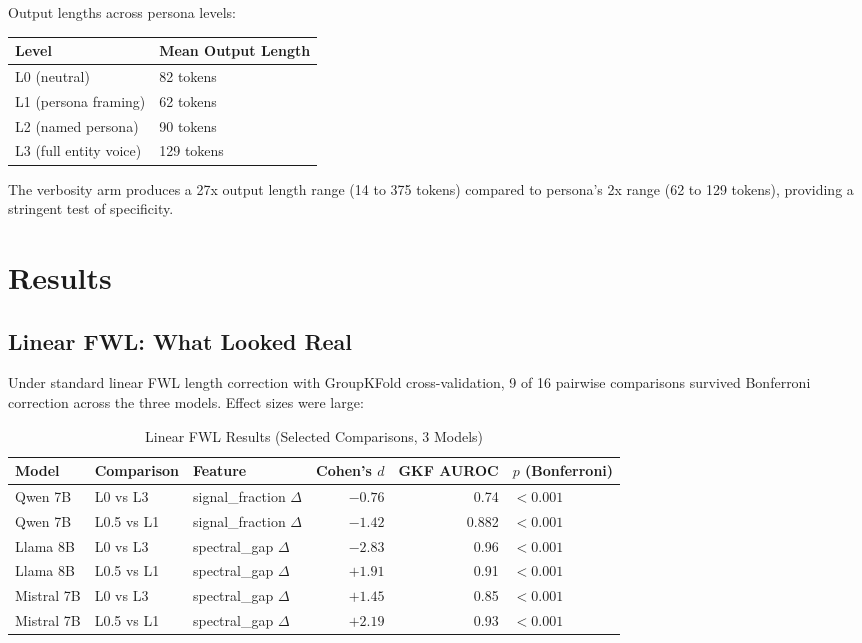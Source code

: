 \documentclass[11pt]{article}
\begin{document}
Output lengths across persona levels:

\begin{table}[H]
\centering
\begin{tabular}{ll}
\toprule
Level & Mean Output Length \\
\midrule
L0 (neutral) & 82 tokens \\
L1 (persona framing) & 62 tokens \\
L2 (named persona) & 90 tokens \\
L3 (full entity voice) & 129 tokens \\
\bottomrule
\end{tabular}
\end{table}

The verbosity arm produces a 27x output length range (14 to 375 tokens) compared to persona's 2x range (62 to 129 tokens), providing a stringent test of specificity.

\section{Results}
\label{sec:results}

\subsection{Linear FWL: What Looked Real}
\label{sec:linear-fwl}

Under standard linear FWL length correction with GroupKFold cross-validation, 9 of 16 pairwise comparisons survived Bonferroni correction across the three models. Effect sizes were large:

\begin{table}[H]
\centering
\caption{Linear FWL Results (Selected Comparisons, 3 Models)}
\label{tab:linear-fwl}
\begin{tabular}{lllrrl}
\toprule
Model & Comparison & Feature & Cohen's $d$ & GKF AUROC & $p$ (Bonferroni) \\
\midrule
Qwen 7B & L0 vs L3 & signal\_fraction $\Delta$ & $-0.76$ & 0.74 & $< 0.001$ \\
Qwen 7B & L0.5 vs L1 & signal\_fraction $\Delta$ & $-1.42$ & 0.882 & $< 0.001$ \\
Llama 8B & L0 vs L3 & spectral\_gap $\Delta$ & $-2.83$ & 0.96 & $< 0.001$ \\
Llama 8B & L0.5 vs L1 & spectral\_gap $\Delta$ & $+1.91$ & 0.91 & $< 0.001$ \\
Mistral 7B & L0 vs L3 & spectral\_gap $\Delta$ & $+1.45$ & 0.85 & $< 0.001$ \\
Mistral 7B & L0.5 vs L1 & spectral\_gap $\Delta$ & $+2.19$ & 0.93 & $< 0.001$ \\
\bottomrule
\end{tabular}
\end{table}
\end{document}

